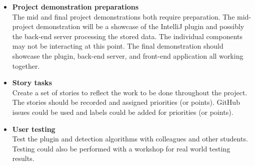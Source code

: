 \begin{itemize}
  \item \textbf{Project demonstration preparations}\\The mid and final project demonstrations both require preparation. The mid-project demonstration will be a showcase of the IntelliJ plugin and possibly the back-end server processing the stored data. The individual components may not be interacting at this point. The final demonstration should showcase the plugin, back-end server, and front-end application all working together.
  \item \textbf{Story tasks}\\Create a set of stories to reflect the work to be done throughout the project. The stories should be recorded and assigned priorities (or points). GitHub issues could be used and labels could be added for priorities (or points).
  \item \textbf{User testing}\\Test the plugin and detection algorithms with colleagues and other students. Testing could also be performed with a workshop for real world testing results.
\end{itemize}